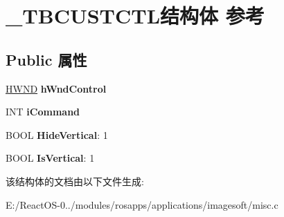 \hypertarget{struct___t_b_c_u_s_t_c_t_l}{}\section{\+\_\+\+T\+B\+C\+U\+S\+T\+C\+T\+L结构体 参考}
\label{struct___t_b_c_u_s_t_c_t_l}
\subsection*{Public 属性}
\begin{DoxyCompactItemize}
\item 
\mbox{\label{struct___t_b_c_u_s_t_c_t_l_afad1e068075fe4c2df6e8e4da0c48b53}} 
\hyperlink{interfacevoid}{H\+W\+ND} {\bfseries h\+Wnd\+Control}
\item 
\mbox{\label{struct___t_b_c_u_s_t_c_t_l_a79e1f04c9f8cc657d87ec4773e8435dd}} 
I\+NT {\bfseries i\+Command}
\item 
\mbox{\label{struct___t_b_c_u_s_t_c_t_l_aa327e2563a3c5ba66123d0595d01a31f}} 
B\+O\+OL {\bfseries Hide\+Vertical}\+: 1
\item 
\mbox{\label{struct___t_b_c_u_s_t_c_t_l_a3011a62e185db35f08e5d705a42ce4c6}} 
B\+O\+OL {\bfseries Is\+Vertical}\+: 1
\end{DoxyCompactItemize}


该结构体的文档由以下文件生成\+:\begin{DoxyCompactItemize}
\item 
E\+:/\+React\+O\+S-\/0../modules/rosapps/applications/imagesoft/misc.\+c\end{DoxyCompactItemize}
